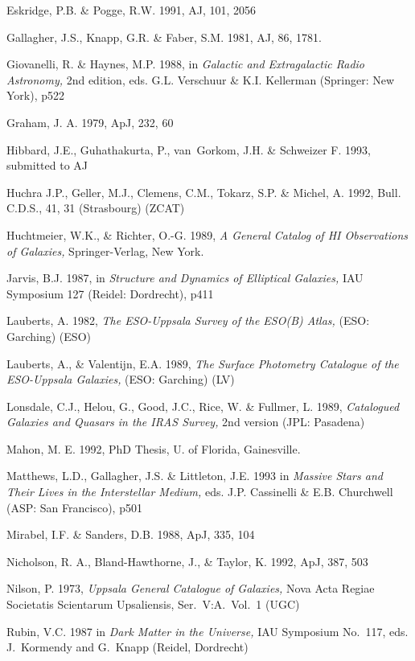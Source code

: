 \bibitem
Eskridge, P.B. \& Pogge, R.W. 1991, AJ, 101, 2056

\bibitem 
Gallagher, J.S., Knapp, G.R. \& Faber, S.M. 1981, AJ, 86, 1781. 

\bibitem
Giovanelli, R. \& Haynes, M.P. 1988, in {\it Galactic and Extragalactic 
Radio Astronomy,\/} 2nd edition, eds. G.L. Verschuur \& K.I. Kellerman
(Springer: New York), p522 

\bibitem
Graham, J. A. 1979, ApJ, 232, 60

\bibitem
Hibbard, J.E., Guhathakurta, P., van~Gorkom, J.H. \& Schweizer F. 1993, 
submitted to AJ

\bibitem
Huchra J.P., Geller, M.J., Clemens, C.M., Tokarz, S.P. \& 
Michel, A. 1992, Bull. C.D.S., 41, 31 (Strasbourg) (ZCAT)

\bibitem
Huchtmeier, W.K., \& Richter, O.-G. 1989, {\it A General Catalog of HI
Observations of Galaxies,\/} Springer-Verlag, New York. 

\bibitem
Jarvis, B.J. 1987, in {\it Structure and Dynamics of Elliptical 
Galaxies,\/} IAU Symposium 127 (Reidel: Dordrecht), p411 

\bibitem
Lauberts, A. 1982, {\it The ESO-Uppsala Survey of the ESO(B) Atlas,\/}  
(ESO: Garching) (ESO)

\bibitem
Lauberts, A., \& Valentijn, E.A. 1989, {\it The Surface Photometry Catalogue 
of the ESO-Uppsala Galaxies,\/} (ESO: Garching) (LV) 

\bibitem
Lonsdale, C.J., Helou, G., Good, J.C., Rice, W. \& Fullmer, L. 1989,
{\it Catalogued Galaxies and Quasars in the IRAS Survey,\/} 
2nd version (JPL: Pasadena) 

\bibitem
Mahon, M. E. 1992, PhD Thesis, U. of Florida, Gainesville.

\bibitem 
Matthews, L.D., Gallagher, J.S. \& Littleton, J.E. 1993 in {\it Massive Stars 
and Their Lives in the Interstellar Medium,\/} eds. J.P. Cassinelli \& E.B. 
Churchwell (ASP: San Francisco), p501 

\bibitem
Mirabel, I.F. \& Sanders, D.B. 1988, ApJ, 335, 104

\bibitem
Nicholson, R. A., Bland-Hawthorne, J., \& Taylor, K. 1992, ApJ, 387, 503

\bibitem
Nilson, P. 1973, {\it Uppsala General Catalogue of Galaxies,\/} 
Nova Acta Regiae Societatis Scientarum Upsaliensis, Ser.\ V:A.\ Vol.\ 1 (UGC) 

\bibitem
Rubin, V.C. 1987 in {\it Dark Matter in the Universe,\/} 
IAU Symposium No.~117, eds. J.~Kormendy and G.~Knapp (Reidel, Dordrecht)


